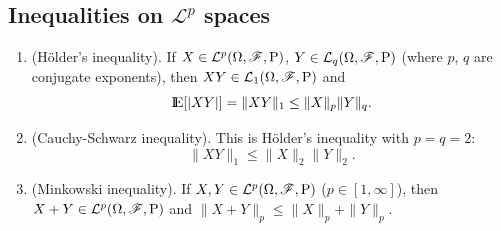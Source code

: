 \documentclass[a4paper,10pt]{scrbook}
\begin{document}
\subsection{Inequalities on $\mathcal{L}^p$ spaces}
\begin{enumerate}
  \item (H\"older's inequality). If $X\in\mathcal{L}^p(\Omega,\mathscr{F},\mathrm{P})$, $Y\in\mathcal{L}_q(\Omega,\mathscr{F},\mathrm{P})$ (where $p$, $q$ are conjugate exponents), then $XY\in\mathcal{L}_1(\Omega,\mathscr{F},\mathrm{P})$ and \[ \E[|XY|] = \|XY\|_1 \leq \|X\|_p \|Y\|_q.\]
 
 \item (Cauchy-Schwarz inequality). This is H\"older's inequality with $p=q=2$:
 \[
    \|XY\|_1 \leq \|X\|_2 \|Y\|_2.
 \]

 \item (Minkowski inequality). If $X,Y\in\mathcal{L}^p(\Omega,\mathscr{F},\mathrm{P})$ ($p\in [1,\infty]$), then $X+Y\in\mathcal{L}^p(\Omega,\mathscr{F},\mathrm{P})$  and 
       $\|X+Y\|_p \leq \|X\|_p + \|Y\|_p$.
\end{enumerate}
\end{document}
